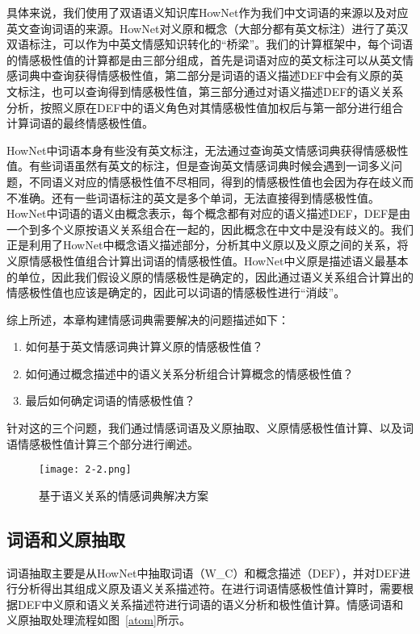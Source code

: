 具体来说，我们使用了双语语义知识库HowNet作为我们中文词语的来源以及对应英文查询词语的来源。HowNet对义原和概念（大部分都有英文标注）进行了英汉双语标注，可以作为中英文情感知识转化的“桥梁”。我们的计算框架中，每个词语的情感极性值的计算都是由三部分组成，首先是词语对应的英文标注可以从英文情感词典中查询获得情感极性值，第二部分是词语的语义描述DEF中会有义原的英文标注，也可以查询得到情感极性值，第三部分通过对语义描述DEF的语义关系分析，按照义原在DEF中的语义角色对其情感极性值加权后与第一部分进行组合计算词语的最终情感极性值。

HowNet中词语本身有些没有英文标注，无法通过查询英文情感词典获得情感极性值。有些词语虽然有英文的标注，但是查询英文情感词典时候会遇到一词多义问题，不同语义对应的情感极性值不尽相同，得到的情感极性值也会因为存在歧义而不准确。还有一些词语标注的英文是多个单词，无法直接得到情感极性值。HowNet中词语的语义由概念表示，每个概念都有对应的语义描述DEF，DEF是由一个到多个义原按语义关系组合在一起的，因此概念在中文中是没有歧义的。我们正是利用了HowNet中概念语义描述部分，分析其中义原以及义原之间的关系，将义原情感极性值组合计算出词语的情感极性值。HowNet中义原是描述语义最基本的单位，因此我们假设义原的情感极性是确定的，因此通过语义关系组合计算出的情感极性值也应该是确定的，因此可以词语的情感极性进行“消歧”。

综上所述，本章构建情感词典需要解决的问题描述如下：
\begin{enumerate}
\item 如何基于英文情感词典计算义原的情感极性值？
\item 如何通过概念描述中的语义关系分析组合计算概念的情感极性值？
\item 最后如何确定词语的情感极性值？
\end{enumerate}

针对这的三个问题，我们通过情感词语及义原抽取、义原情感极性值计算、以及词语情感极性值计算三个部分进行阐述。

\begin{landscape}
\begin{figure*}
\centering
\texttt{[image: 2-2.png]}
\caption{基于语义关系的情感词典解决方案}
\label{frame}
\end{figure*}
\end{landscape}

\subsection{词语和义原抽取}
词语抽取主要是从HowNet中抽取词语（W\_C）和概念描述（DEF），并对DEF进行分析得出其组成义原及语义关系描述符。在进行词语情感极性值计算时，需要根据DEF中义原和语义关系描述符进行词语的语义分析和极性值计算。情感词语和义原抽取处理流程如图~\ref{atom}所示。

